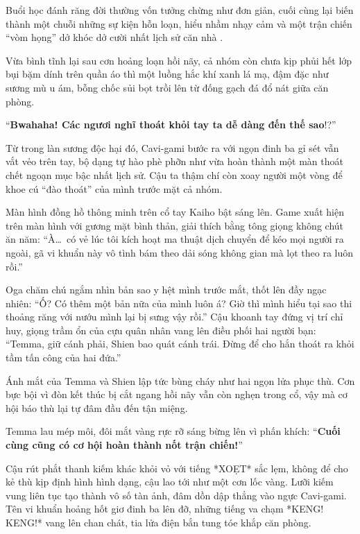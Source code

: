 \documentclass[../main.tex]{subfiles}
\begin{document}
Buổi học đánh răng đời thường vốn tưởng chừng như đơn giản, cuối cùng lại biến thành một chuỗi những sự kiện hỗn loạn, hiểu nhầm nhạy cảm và một trận chiến ``vòm họng'' dở khóc dở cười nhất lịch sử căn nhà \hls.

\omk

Vừa bình tĩnh lại sau cơn hoảng loạn hồi nãy, cả nhóm còn chưa kịp phủi hết lớp bụi bặm dính trên quần áo thì một luồng hắc khí xanh lá mạ, đậm đặc như sương mù u ám, bỗng chốc sủi bọt trồi lên từ đống gạch đá đổ nát giữa căn phòng.

``\textbf{Bwahaha! Các ngươi nghĩ thoát khỏi tay ta dễ dàng đến thế sao}!?''

Từ trong làn sương độc hại đó, Cavi-gami bước ra với ngọn đinh ba gỉ sét vẫn vắt vẻo trên tay, bộ dạng tự hào phè phỡn như vừa hoàn thành một màn thoát chết ngoạn mục bậc nhất lịch sử. Cậu ta thậm chí còn xoay người một vòng để khoe cú ``đào thoát'' của mình trước mặt cả nhóm.

Màn hình đồng hồ thông minh trên cổ tay Kaiho bật sáng lên.  Game xuất hiện trên màn hình với gương mặt bình thản, giải thích bằng tông giọng không chút ăn năm: ``À\dots\ có vẻ lúc tôi kích hoạt ma thuật dịch chuyển để kéo mọi người ra ngoài, gã vi khuẩn này vô tình bám theo dải sóng không gian mà lọt theo ra luôn rồi.''

Oga chăm chú ngắm nhìn bản sao y hệt mình trước mắt, thốt lên đầy ngạc nhiên: ``Ố? Có thêm một bản nữa của mình luôn á? Giờ thì mình hiểu tại sao thi thoảng răng với nướu mình lại bị sưng vậy rồi.'' Cậu khoanh tay đứng vị trí chỉ huy, giọng trầm ổn của cựu quân nhân vang lên điều phối hai người bạn: ``Temma, giữ cánh phải, Shien bao quát cánh trái. Đừng để cho hắn thoát ra khỏi tầm tấn công của hai đứa.''

Ánh mắt của Temma và Shien lập tức bùng cháy như hai ngọn lửa phục thù. Cơn bực bội vì đòn kết thúc bị cắt ngang hồi nãy vẫn còn nghẹn trong cổ, vậy mà cơ hội báo thù lại tự đâm đầu đến tận miệng.

Temma lau mép môi, đôi mắt vàng rực rỡ sáng bừng lên vì phấn khích: ``\textbf{Cuối cùng cũng có cơ hội hoàn thành nốt trận chiến!}''

Cậu rút phắt thanh kiếm khác khỏi vỏ với tiếng *XOẸT* sắc lẹm, không để cho kẻ thù kịp định hình hình dạng, cậu lao tới như một cơn lốc vàng. Lưỡi kiếm vung liên tục tạo thành vô số tàn ảnh, đâm dồn dập thẳng vào ngực Cavi-gami. Tên vi khuẩn hoảng hốt giơ đinh ba lên đỡ, những tiếng va chạm *KENG! KENG!* vang lên chan chát, tia lửa điện bắn tung tóe khắp căn phòng.
\end{document}
